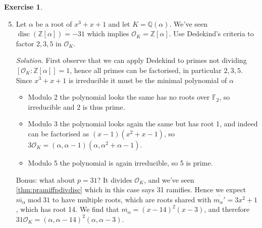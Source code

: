 \documentclass{article}
\newcommand{\Z}{\mathbb{Z}}
\newcommand{\Q}{\mathbb{Q}}
\newcommand{\F}{\mathbb{F}}
\newcommand{\Mod}{\operatorname{mod}}
\newcommand{\disc}{\operatorname{disc}}
\newcommand{\ri}{\mathcal{O}}
\theoremstyle{definition}
\newtheorem{exe}[defn]{Exercise}
\begin{document}
\begin{exe}
\begin{enumerate}
\setcounter{enumi}{4}
\item Let $\alpha$ be a root of $x^3+x+1$ and let $K=\Q(\alpha)$. We've seen $\disc(\Z[\alpha])=-31$ which implies $\ri_K=\Z[\alpha]$. Use Dedekind's criteria to factor $2,3,5$ in $\ri_K$.

\textit{Solution}. First observe that we can apply Dedekind to primes not dividing $[\ri_K:\Z[\alpha]]=1$, hence all primes can be factorised, in particular $2,3,5$. Since $x^3+x+1$ is irreducible it must be the minimal polynomial of $\alpha$
\begin{itemize}
\item Modulo 2 the polynomial looks the same has no roots over $\F_2$, so irreducible and 2 is thus prime.
\item Modulo 3 the polynomial looks again the same but has root 1, and indeed can be factorised as $(x-1)(x^2+x-1)$, so $3\ri_K=(\alpha,\alpha-1)(\alpha,\alpha^2+\alpha-1)$.
\item Modulo 5 the polynomial is again irreducible, so 5 is prime.
\end{itemize}
Bonus: what about $p=31$? It divides $\ri_K$, and we've seen \ref{thm:pramiffpdivdisc} which in this case says 31 ramifies. Hence we expect $\overline{m_\alpha}\Mod 31$ to have multiple roots, which are roots shared with $\overline{m_\alpha'}=3x^2+1$, which has root 14. We find that $\overline{m_\alpha}=(x-14)^2(x-3)$, and therefore $31\ri_K=(\alpha,\alpha-14)^2(\alpha,\alpha-3)$.


\end{enumerate}
\end{exe}
\end{document}
